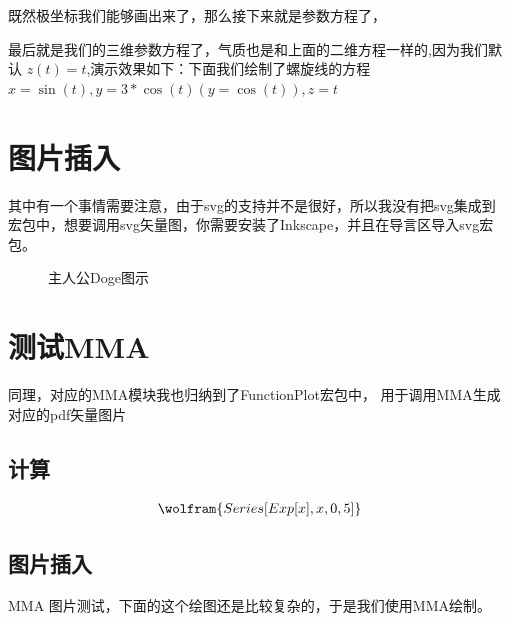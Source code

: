 \documentclass[12pt]{article}
\begin{document}
\begin{center}
\end{center}


既然极坐标我们能够画出来了，那么接下来就是参数方程了，
\begin{center}
\end{center}

最后就是我们的三维参数方程了，气质也是和上面的二维方程一样的,因为我们默认
$z(t) = t$,演示效果如下：下面我们绘制了螺旋线的方程 $x=\sin(t),y=3*\cos(t)(y=\cos(t)),z=t$
\begin{center}
\end{center}



\section{图片插入}

其中有一个事情需要注意，由于svg的支持并不是很好，所以我没有把svg集成到
宏包中，想要调用svg矢量图，你需要安装了Inkscape，并且在导言区导入svg宏包。

\begin{figure}[!htb]
    \centering
    
    \caption{主人公Doge图示}
    \label{Doge}
\end{figure}


\section{测试MMA}
同理，对应的MMA模块我也归纳到了FunctionPlot宏包中，
用于调用MMA生成对应的pdf矢量图片

\subsection{计算}
\begin{align}
    \wolfram{Series[Exp[x], {x, 0, 5}]}
\end{align}

\subsection{图片插入}
MMA 图片测试，下面的这个绘图还是比较复杂的，于是我们使用MMA绘制。
\end{document}
